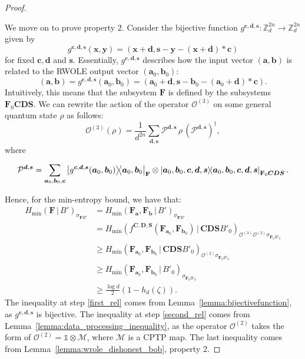 \begin{proof}
\

We move on to prove property $2$. Consider the bijective function $g^{\bm{c},\bm{d},\bm{s}} : \mathbb{Z}^{2n}_d \rightarrow \mathbb{Z}^{2n}_d$ given by 
$$g^{\bm{c},\bm{d},\bm{s}}(\bm{x}, \bm{y}) = (\bm{x} + \bm{d}, \bm{s} - \bm{y} - (\bm{x} + \bm{d}) * \bm{c})$$
for fixed $\bm{c}, \bm{d}$ and $\bm{s}$. Essentially, $g^{\bm{c},\bm{d},\bm{s}}$ describes how the input vector $(\bm{a}, \bm{b})$ is related to the RWOLE output vector $(\bm{a}_0, \bm{b}_0)$:
\begin{equation}
\label{eq:def_ab}
    (\bm{a}, \bm{b}) = g^{\bm{c},\bm{d},\bm{s}}(\bm{a}_0, \bm{b}_0) = (\bm{a}_0 + \bm{d}, \bm{s} - \bm{b}_0 - (\bm{a}_0 + \bm{d})  * \bm{c}).
\end{equation}
Intuitively, this means that the subsystem $\mathbf{F}$ is defined by the subsystems $\mathbf{F}_0 \mathbf{C} \mathbf{D} \mathbf{S}$. We can rewrite  the action of the operator $\mathcal{O}^{(3)}$  on some general quantum state $\rho$ as follows:
\begin{equation*}
    \mathcal{O}^{(3)}(\rho) = \frac{1}{d^{2n}} \sum_{\bm{d}, \bm{s}} \mathcal{P}^{\bm{d}, \bm{s}}\, \rho \, (\mathcal{P}^{\bm{d}, \bm{s} })^\dagger,
\end{equation*}
where 
\begin{small}
\begin{equation}
\mathcal{P}^{\bm{d}, \bm{s}} = \sum_{\bm{a}_0, \bm{b}_0, \bm{c}} \ketbra{g^{\bm{c},\bm{d},\bm{s}}(\bm{a}_0, \bm{b}_0)}{\bm{a}_0, \bm{b}_0}_{\mathbf{F}} \otimes \ketbra{\bm{a}_0, \bm{b}_0, \bm{c}, \bm{d}, \bm{s}}_{\mathbf{F}_0 \bm{C} \bm{D} \bm{S}}. \nonumber
\end{equation}
\end{small}


Hence, for the min-entropy bound,  we have that:
\begin{align}
H_{\min}(\mathbf{F} \,|\, B')_{\sigma_{\mathbf{F}B'}} &= H_{\min}(\mathbf{F}_{\bm{a}}, \mathbf{F}_{\bm{b}} \,|\, B')_{\sigma_{\mathbf{F}B'}} \nonumber\\
&=H_{\min}( f^{\bm{C},\bm{D},\bm{S}}(\mathbf{F}_{\bm{a}_0}, \mathbf{F}_{\bm{b}_0} )  \,|\, \mathbf{C} \mathbf{D} \mathbf{S} B'_0)_{\mathcal{O}^{(3)} \mathcal{O}^{(2)}\sigma_{\mathbf{F}_0B'_0}} \nonumber\\
&\geq H_{\min}(\mathbf{F}_{\bm{a}_0}, \mathbf{F}_{\bm{b}_0} \,|\, \mathbf{C} \mathbf{D} \mathbf{S} B'_0)_{ \mathcal{O}^{(2)}\sigma_{\mathbf{F}_0B'_0}} \label{first_rel} \\
&\geq H_{\min}(\mathbf{F}_{\bm{a}_0}, \mathbf{F}_{\bm{b}_0} \,|\, B'_0)_{\sigma_{\mathbf{F}_0B'_0}} \label{second_rel}\\
&\geq \frac{\log d}{2}(1 - h_d(\zeta)). \label{third_rel}
\end{align}
The inequality at step \eqref{first_rel} comes from Lemma~\ref{lemma:bijectivefunction},  as $g^{\bm{c},\bm{d},\bm{s}}$ is bijective. The inequality at step \eqref{second_rel} comes from Lemma~\ref{lemma:data_processing_inequality}, as the operator $\mathcal{O}^{(2)}$ takes the form of $\mathcal{O}^{(2)} = \mathds{1} \otimes \mathcal{M}$, where $\mathcal{M}$ is a CPTP map. The last inequality comes from Lemma~\ref{lemma:wrole_dishonest_bob}, property 2.


\end{proof}
